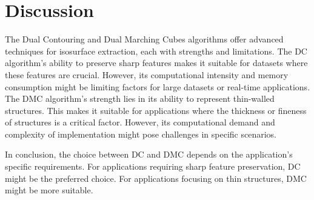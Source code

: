 \section{Discussion}

The Dual Contouring and Dual Marching Cubes algorithms offer advanced techniques for isosurface extraction, each with strengths and limitations. The DC algorithm's ability to preserve sharp features makes it suitable for datasets where these features are crucial. However, its computational intensity and memory consumption might be limiting factors for large datasets or real-time applications. The DMC algorithm's strength lies in its ability to represent thin-walled structures. This makes it suitable for applications where the thickness or fineness of structures is a critical factor. However, its computational demand and complexity of implementation might pose challenges in specific scenarios.

In conclusion, the choice between DC and DMC depends on the application's specific requirements. For applications requiring sharp feature preservation, DC might be the preferred choice. For applications focusing on thin structures, DMC might be more suitable.